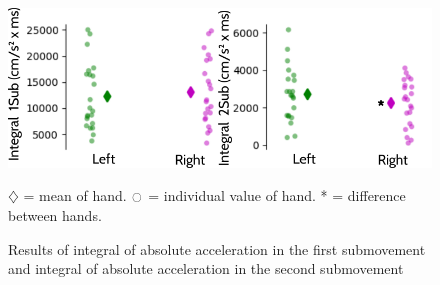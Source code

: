 \documentclass[man,a4paper,12pt,floatsintext]{apa6}
\begin{document}
\begin{figure}[p] %
\includegraphics[width=\linewidth]{figures/f7.png}
\caption{Results of integral of absolute acceleration in the first submovement and integral of absolute acceleration in the second submovement}{$\diamondsuit$ = mean of hand. $\ocircle$ = individual value of hand. * = difference between hands.}
\label{fig6}
\end{figure} 
\end{document}
